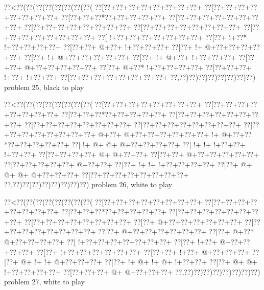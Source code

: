 \vbox{\vbox{\goo
\0??<\0??(\0??(\0??(\0??(\0??(\0??(\0??(\0??(
\0??[\0??+\0??+\0??+\0??+\0??+\0??+\0??+\0??+
\0??[\0??+\0??+\0??+\0??+\0??+\0??+\0??+\0??+
\0??[\0??+\0??+\0??*\0??+\0??+\0??+\0??+\0??+
\0??[\0??+\0??+\0??+\0??+\0??+\0??+\0??+\0??+
\0??[\0??+\0??+\0??+\0??+\0??+\0??+\0??+\0??+
\0??[\0??+\0??+\0??+\0??+\0??+\0??+\0??+\0??+
\0??[\0??+\0??+\0??+\0??+\0??+\0??+\0??+\0??+
\0??[\- !+\0??+\0??+\0??+\0??+\0??+\0??+\0??+
\0??[\0??+\- !+\0??*\- !+\0??+\0??+\0??+\0??+
\0??[\0??+\0??+\- @+\0??+\- !+\0??+\0??+\0??+
\0??[\0??+\- !+\- @+\0??+\0??+\0??+\0??+\0??+
\0??[\0??+\- !+\- @+\0??+\0??+\0??+\0??+\0??+
\0??[\0??+\- !+\- @+\0??+\- !+\0??+\0??+\0??+
\0??[\0??+\0??+\- @+\0??+\0??+\0??+\0??+\0??+
\0??[\0??+\- @+\0??*\- !+\0??+\0??+\0??+\0??+
\0??[\0??+\0??+\0??+\- !+\0??+\- !+\0??+\0??+
\0??[\0??+\0??+\0??+\0??+\0??+\0??+\0??+\0??+
\0??,\0??)\0??)\0??)\0??)\0??)\0??)\0??)\0??)
}
\hfil problem 25, black to play\hfil\break
}

\vbox{\vbox{\goo
\0??<\0??(\0??(\0??(\0??(\0??(\0??(\0??(\0??(
\0??[\0??+\0??+\0??+\0??+\0??+\0??+\0??+\0??+
\0??[\0??+\0??+\0??+\0??+\0??+\0??+\0??+\0??+
\0??[\0??+\0??+\0??*\0??+\0??+\0??+\0??+\0??+
\0??[\0??+\0??+\0??+\0??+\0??+\0??+\0??+\0??+
\0??[\0??+\0??+\0??+\0??+\0??+\0??+\0??+\0??+
\0??[\0??+\0??+\0??+\0??+\0??+\0??+\0??+\0??+
\0??[\0??+\0??+\0??+\0??+\0??+\0??+\0??+\0??+
\- @+\0??+\- @+\0??+\0??+\0??+\0??+\0??+\0??+
\- !+\- @+\0??+\0??*\0??+\0??+\0??+\0??+\0??+
\0??[\- !+\- @+\- @+\- @+\0??+\0??+\0??+\0??+
\0??[\- !+\- !+\- !+\0??+\0??+\- !+\0??+\0??+
\0??[\0??+\0??+\0??+\0??+\- @+\- @+\0??+\0??+
\0??[\0??+\0??+\- @+\0??+\0??+\0??+\0??+\0??+
\0??[\0??+\0??+\0??+\0??+\0??+\- @+\0??+\0??+
\0??[\0??+\- !+\- !+\- !+\0??+\0??+\0??+\0??+
\0??[\0??+\- @+\- @+\- @+\- @+\0??+\0??+\0??+
\0??[\0??+\0??+\0??+\0??+\0??+\0??+\0??+\0??+
\0??,\0??)\0??)\0??)\0??)\0??)\0??)\0??)\0??)
}
\hfil problem 26, white to play\hfil\break
}

\vbox{\vbox{\goo
\0??<\0??(\0??(\0??(\0??(\0??(\0??(\0??(\0??(
\0??[\0??+\0??+\0??+\0??+\0??+\0??+\0??+\0??+
\0??[\0??+\0??+\0??+\0??+\0??+\0??+\0??+\0??+
\0??[\0??+\0??+\0??*\0??+\0??+\0??+\0??+\0??+
\0??[\0??+\0??+\0??+\0??+\0??+\0??+\0??+\0??+
\0??[\0??+\0??+\0??+\0??+\0??+\0??+\0??+\0??+
\0??[\0??+\- @+\0??+\0??+\0??+\0??+\0??+\0??+
\0??[\0??+\0??+\0??+\0??+\0??+\0??+\0??+\0??+
\0??[\0??+\- @+\0??+\0??+\0??+\0??+\0??+\0??+
\0??[\0??+\- @+\0??*\- @+\0??+\0??+\0??+\0??+
\0??[\- !+\0??+\0??+\0??+\0??+\0??+\0??+\0??+
\0??[\0??+\- !+\0??+\- @+\0??+\0??+\0??+\0??+
\0??[\0??+\- !+\0??+\0??+\0??+\0??+\0??+\0??+
\0??[\0??+\0??+\- !+\0??+\- @+\0??+\0??+\0??+
\0??[\0??+\- @+\- !+\- !+\- @+\0??+\0??+\0??+
\0??[\0??+\- !+\- @+\- !+\- @+\- !+\0??+\0??+
\0??[\0??+\- @+\- @+\- !+\0??+\0??+\0??+\0??+
\0??[\0??+\0??+\0??+\- @+\- @+\0??+\0??+\0??+
\0??,\0??)\0??)\0??)\0??)\0??)\0??)\0??)\0??)
}
\hfil problem 27, white to play\hfil\break
}


